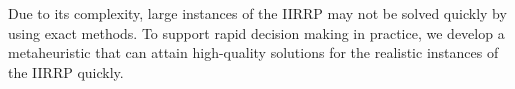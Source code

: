 \documentclass[11pt]{article}
\begin{document}


Due to its complexity, large instances of the IIRRP may not be solved quickly by using exact methods. To support rapid decision making in practice, we develop a metaheuristic that can attain high-quality solutions for the realistic instances of the IIRRP quickly.
\end{document}
